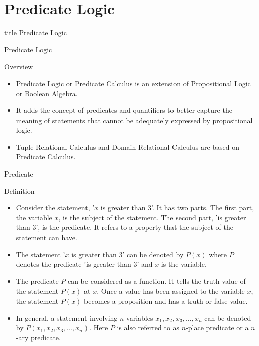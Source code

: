 \documentclass[aspectratio=169, xcolor=dvipsnames]{beamer}
\begin{document}
\section{Predicate Logic}
\begin{frame}
  \vfill
  \centering
  \begin{beamercolorbox}[sep=8pt,center,shadow=true,rounded=true]{title}
    Predicate Logic\par%
  \end{beamercolorbox}
  \vfill
\end{frame}

\begin{frame}{Predicate Logic}
    \begin{block}{Overview}
        \begin{itemize}[<+->]
            \item Predicate Logic or Predicate Calculus is an extension of Propositional Logic or Boolean Algebra.
            \item It adds the concept of predicates and quantifiers to better capture the meaning of statements that cannot be adequately expressed by propositional logic.
            \item Tuple Relational Calculus and Domain Relational Calculus are based on Predicate Calculus.
        \end{itemize}
    \end{block}
\end{frame}

\begin{frame}{Predicate}
    \begin{block}{Definition}
        \begin{itemize}[<+->]
            \item Consider the statement, '$x$ is greater than 3'. It has two parts. The first part, the variable $x$, is the subject of the statement. The second part, 'is greater than 3', is the predicate. It refers to a property that the subject of the statement can have.
            \item The statement '$x$ is greater than 3' can be denoted by $P(x)$ where $P$ denotes the predicate 'is greater than 3' and $x$ is the variable.
            \item The predicate $P$ can be considered as a function. It tells the truth value of the statement $P(x)$ at $x$. Once a value has been assigned to the variable $x$, the statement $P(x)$ becomes a proposition and has a truth or false value.
            \item In general, a statement involving $n$ variables $x_1, x_2, x_3, \dots, x_n$ can be denoted by $P(x_1, x_2, x_3, \dots, x_n)$. Here $P$ is also referred to as $n$-place predicate or a $n$-ary predicate.
        \end{itemize}
    \end{block}
\end{frame}
\end{document}
